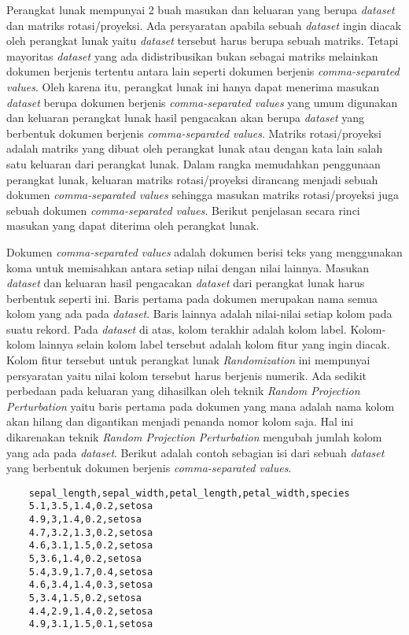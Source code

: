 Perangkat lunak mempunyai 2 buah masukan dan keluaran yang berupa \textit{dataset} dan matriks rotasi/proyeksi. Ada persyaratan apabila sebuah \textit{dataset} ingin diacak oleh perangkat lunak yaitu \textit{dataset} tersebut harus berupa sebuah matriks. Tetapi mayoritas \textit{dataset} yang ada didistribusikan bukan sebagai matriks melainkan dokumen berjenis tertentu antara lain seperti dokumen berjenis \textit{comma-separated values}. Oleh karena itu, perangkat lunak ini hanya dapat menerima masukan \textit{dataset} berupa dokumen berjenis \textit{comma-separated values} yang umum digunakan dan keluaran perangkat lunak hasil pengacakan akan berupa \textit{dataset} yang berbentuk dokumen berjenis \textit{comma-separated values}. Matriks rotasi/proyeksi adalah matriks yang dibuat oleh perangkat lunak atau dengan kata lain salah satu keluaran dari perangkat lunak. Dalam rangka memudahkan penggunaan perangkat lunak, keluaran matriks rotasi/proyeksi dirancang menjadi sebuah dokumen \textit{comma-separated values} sehingga masukan matriks rotasi/proyeksi juga sebuah dokumen \textit{comma-separated values}. Berikut penjelasan secara rinci masukan yang dapat diterima oleh perangkat lunak.

Dokumen \textit{comma-separated values} adalah dokumen berisi teks yang menggunakan koma untuk memisahkan antara setiap nilai dengan nilai lainnya. Masukan \textit{dataset} dan keluaran hasil pengacakan \textit{dataset} dari perangkat lunak harus berbentuk seperti ini. Baris pertama pada dokumen merupakan nama semua kolom yang ada pada \textit{dataset}. Baris lainnya adalah nilai-nilai setiap kolom pada suatu rekord. Pada \textit{dataset} di atas, kolom terakhir adalah kolom label. Kolom-kolom lainnya selain kolom label tersebut adalah kolom fitur yang ingin diacak. Kolom fitur tersebut untuk perangkat lunak \textit{Randomization} ini mempunyai persyaratan yaitu nilai kolom tersebut harus berjenis numerik. Ada sedikit perbedaan pada keluaran yang dihasilkan oleh teknik \textit{Random Projection Perturbation} yaitu baris pertama pada dokumen yang mana adalah nama kolom akan hilang dan digantikan menjadi penanda nomor kolom saja. Hal ini dikarenakan teknik \textit{Random Projection Perturbation} mengubah jumlah kolom yang ada pada \textit{dataset}. Berikut adalah contoh sebagian isi dari sebuah \textit{dataset} yang berbentuk dokumen berjenis \textit{comma-separated values}.

\begin{verbatim}
	sepal_length,sepal_width,petal_length,petal_width,species
	5.1,3.5,1.4,0.2,setosa
	4.9,3,1.4,0.2,setosa
	4.7,3.2,1.3,0.2,setosa
	4.6,3.1,1.5,0.2,setosa
	5,3.6,1.4,0.2,setosa
	5.4,3.9,1.7,0.4,setosa
	4.6,3.4,1.4,0.3,setosa
	5,3.4,1.5,0.2,setosa
	4.4,2.9,1.4,0.2,setosa
	4.9,3.1,1.5,0.1,setosa
\end{verbatim}

